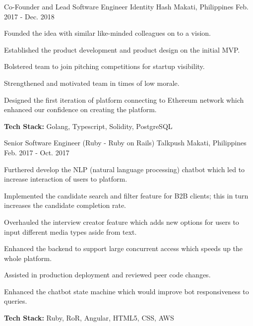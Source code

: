 \begin{cventries}
    \cventry
        {Co-Founder and Lead Software Engineer}
        {Identity Hash}
        {Makati, Philippines}
        {Feb. 2017 - Dec. 2018}
        {
            \begin{cvitems}
                \item
                    {Founded the idea with similar like-minded colleagues on to a vision.}
                \item
                    {Established the product development and product design on the initial MVP.}
                \item
                    {Bolstered team to join pitching competitions for startup visibility.}
                \item
                    {Strengthened and motivated team in times of low morale.}
                \item
                    {Designed the first iteration of platform connecting to Ethereum network which enhanced our confidence on creating the platform.}
                \item 
                    {\textbf{Tech Stack:} Golang, Typescript, Solidity, PostgreSQL}
            \end{cvitems}
        }
        
    \cventry
        {Senior Software Engineer (Ruby - Ruby on Rails)}
        {Talkpush}
        {Makati, Philippines}
        {Feb. 2017 - Oct. 2017}
        {
            \begin{cvitems}
                \item
                    {Furthered develop the NLP (natural language processing) chatbot which led to increase interaction of users to platform.}
                \item
                    {Implemented the candidate search and filter feature for B2B clients; this in turn increases the candidate completion rate.}
                \item
                    {Overhauled the interview creator feature which adds new options for users to input different media types aside from text.}
                \item
                    {Enhanced the backend to support large concurrent access which speeds up the whole platform.}
                \item 
                    {Assisted in production deployment and reviewed peer code changes.}
                \item 
                    {Enhanced the chatbot state machine which would improve bot responsiveness to queries.}
                \item 
                    {\textbf{Tech Stack:} Ruby, RoR, Angular, HTML5, CSS, AWS}
            \end{cvitems}
        }
    

\end{cventries}
